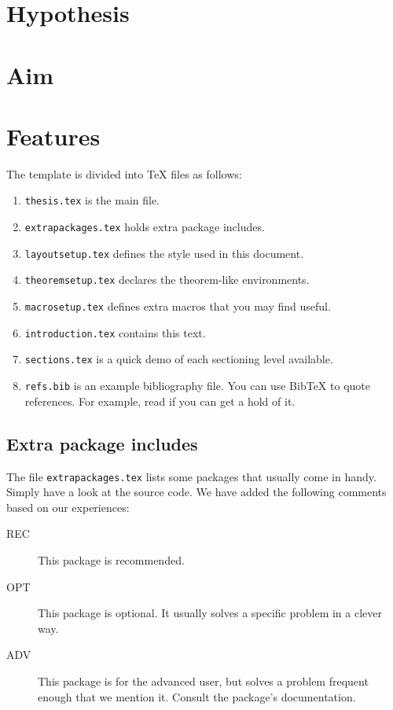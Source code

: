 \section{Hypothesis}

\section{Aim}

\section{Features}
\label{sec:features}

The template is divided into \TeX{} files as follows:
\begin{enumerate}
\item \texttt{thesis.tex} is the main file.
\item \texttt{extrapackages.tex} holds extra package includes.
\item \texttt{layoutsetup.tex} defines the style used in this document.
\item \texttt{theoremsetup.tex} declares the theorem-like environments.
\item \texttt{macrosetup.tex} defines extra macros that you may find
  useful.
\item \texttt{introduction.tex} contains this text.
\item \texttt{sections.tex} is a quick demo of each sectioning level
  available.
\item \texttt{refs.bib} is an example bibliography file.  You can use
  Bib\TeX{} to quote references.  For example, read
  \cite{bringhurst1996ets} if you can get a hold of it.
\end{enumerate}


\subsection{Extra package includes}

The file \texttt{extrapackages.tex} lists some packages that usually
come in handy.  Simply have a look at the source code.  We have
added the following comments based on our experiences:
\begin{description}
\item[REC] This package is recommended.
\item[OPT] This package is optional.  It usually solves a specific
  problem in a clever way.
\item[ADV] This package is for the advanced user, but solves a problem
  frequent enough that we mention it. Consult the package's
  documentation.
\end{description}

